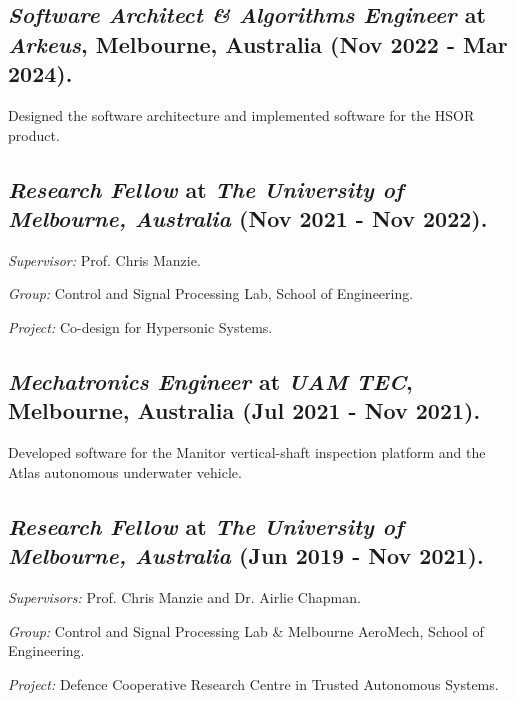 \documentclass[letterpaper]{article}
\renewenvironment{itemize}{
  \begin{list}{}{
    \setlength{\leftmargin}{1.5em}
  }
}{
  \end{list}
}
\begin{document}
\subsection*{\emph{Software Architect \& Algorithms Engineer} at \emph{Arkeus}, Melbourne, Australia (Nov 2022 - Mar 2024).}
\begin{itemize}
	\item Designed the software architecture and implemented software for the HSOR product.
\end{itemize}

\subsection*{\emph{Research Fellow} at \emph{The University of Melbourne, Australia} (Nov 2021 - Nov 2022).}
\begin{itemize}
	\item \emph{Supervisor:} Prof. Chris Manzie.
	\item \emph{Group:} Control and Signal Processing Lab, School of Engineering.
	\item \emph{Project:} Co-design for Hypersonic Systems.
\end{itemize}

\subsection*{\emph{Mechatronics Engineer} at \emph{UAM TEC}, Melbourne, Australia (Jul 2021 - Nov 2021).}
\begin{itemize}
	\item Developed software for the Manitor vertical-shaft inspection platform and the Atlas autonomous underwater vehicle.
\end{itemize}

\subsection*{\emph{Research Fellow} at \emph{The University of Melbourne, Australia} (Jun 2019 - Nov 2021).}
\begin{itemize}
	\item \emph{Supervisors:} Prof. Chris Manzie and Dr. Airlie Chapman.
	\item \emph{Group:} Control and Signal Processing Lab \& Melbourne AeroMech, School of Engineering.
	\item \emph{Project:} Defence Cooperative Research Centre in Trusted Autonomous Systems.
\end{itemize}
\end{document}
